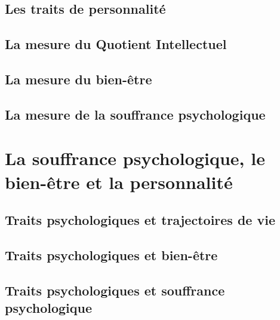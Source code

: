 \documentclass[]{book}
\begin{document}
\hypertarget{les-traits-de-personnalite}{%
\section{Les traits de personnalité}\label{les-traits-de-personnalite}}

\hypertarget{la-mesure-du-quotient-intellectuel}{%
\section{La mesure du Quotient Intellectuel}\label{la-mesure-du-quotient-intellectuel}}

\hypertarget{la-mesure-du-bien-etre}{%
\section{La mesure du bien-être}\label{la-mesure-du-bien-etre}}

\hypertarget{la-mesure-de-la-souffrance-psychologique}{%
\section{La mesure de la souffrance psychologique}\label{la-mesure-de-la-souffrance-psychologique}}

\hypertarget{la-souffrance-psychologique-le-bien-etre-et-la-personnalite}{%
\chapter{La souffrance psychologique, le bien-être et la personnalité}\label{la-souffrance-psychologique-le-bien-etre-et-la-personnalite}}

\hypertarget{traits-psychologiques-et-trajectoires-de-vie}{%
\section{Traits psychologiques et trajectoires de vie}\label{traits-psychologiques-et-trajectoires-de-vie}}

\hypertarget{traits-psychologiques-et-bien-etre}{%
\section{Traits psychologiques et bien-être}\label{traits-psychologiques-et-bien-etre}}

\hypertarget{traits-psychologiques-et-souffrance-psychologique}{%
\section{Traits psychologiques et souffrance psychologique}\label{traits-psychologiques-et-souffrance-psychologique}}
\end{document}
